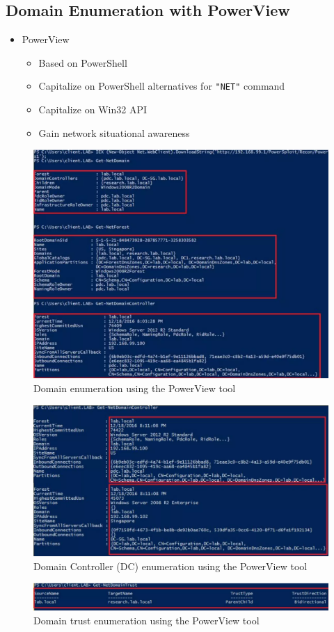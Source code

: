 \subsection{Domain Enumeration with PowerView}
\begin{itemize}
    \item PowerView
    \begin{itemize}
        \item Based on PowerShell
        \item Capitalize on PowerShell alternatives for \texttt{"NET"} command 
        \item    Capitalize on Win32 API
        \item Gain network situational awareness
\end{itemize}
\end{itemize}
\begin{figure}
    \centering
    \includegraphics[width=0.75\linewidth]{pv1.png}
    \caption{Domain enumeration using the PowerView tool}
    \label{fig:placeholder}
\end{figure}
\begin{figure}
    \centering
    \includegraphics[width=0.75\linewidth]{domenum3.png}
    \caption{Domain Controller (DC) enumeration using the PowerView tool}
    \label{fig:placeholder}
\end{figure}
\begin{figure}
    \centering
    \includegraphics[width=0.75\linewidth]{trustenum.png}
    \caption{Domain trust enumeration using the PowerView tool}
    \label{fig:placeholder}
\end{figure}
